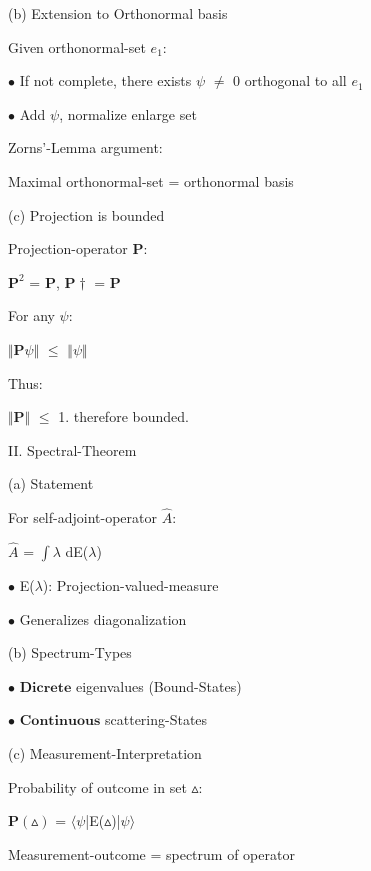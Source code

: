\documentclass[a4paper, 10pt, onepage]{elegantbook}
\begin{document}
{(b) Extension to Orthonormal basis  
  

Given orthonormal-set $e_1$:  
  
$\bullet$ If not complete, there exists $\psi$ $\neq$ 0 orthogonal to all $e_1$  
  
$\bullet$ Add $\psi$, normalize enlarge set 

Zorns'-Lemma argument:  

Maximal orthonormal-set = orthonormal basis  

(c) Projection is bounded  

Projection-operator $\mathbf P$:  
    
    $\mathbf P^2$ = $\mathbf P$, $\mathbf {P}\dagger$ = $\mathbf P$ 
    
For any $\psi$: 
    
    $\Vert \mathbf P \psi \Vert$ $\leq$ $\Vert \psi \Vert$ 
    
    Thus: 
 
        $\Vert \mathbf P \Vert$ $\leq$ 1. therefore bounded. 

II. Spectral-Theorem 
 
(a) Statement 

For self-adjoint-operator $\hat A$:  
  
    $\hat A$ = $\int \lambda$ dE($\lambda$)  
  
$\bullet$ E($\lambda$): Projection-valued-measure  
  
$\bullet$ Generalizes diagonalization 

(b) Spectrum-Types 
 
$\bullet$ $\mathbf {Dicrete}$ eigenvalues (Bound-States) 
 
$\bullet$ $\mathbf {Continuous}$ scattering-States  

(c) Measurement-Interpretation 

Probability of outcome in set $\vartriangle$: 
 
    $\mathbf {P}(\vartriangle)$ = $\langle \psi$|E($\vartriangle$)|$\psi \rangle$  

    Measurement-outcome = spectrum of operator  

}
\end{document}
